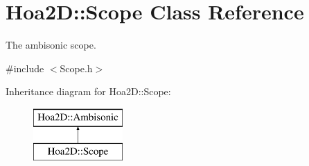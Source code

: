 \hypertarget{class_hoa2_d_1_1_scope}{\section{Hoa2\-D\-:\-:Scope Class Reference}
\label{class_hoa2_d_1_1_scope}
}


The ambisonic scope.  




{\ttfamily \#include $<$Scope.\-h$>$}

Inheritance diagram for Hoa2\-D\-:\-:Scope\-:\begin{figure}[H]
\begin{center}
\leavevmode
\includegraphics[height=2.000000cm]{class_hoa2_d_1_1_scope}
\end{center}
\end{figure}
